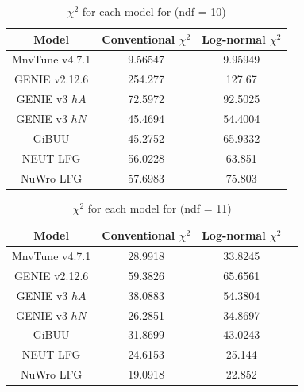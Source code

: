 \documentclass[aps,prl,twocolumn,showpacs,superscriptaddress,letterpaper,showkeys,superscriptaddress,floatfix,nofootinbib]{revtex4-1}
\begin{document}
\begin{table}[H]
  \centering
  \renewcommand{\arraystretch}{1.15}
  \caption{$\chi^2$ for each model for \Tpi (ndf = 10)}
    \begin{tabular}{c||c|c}
        Model & Conventional $\chi^2$ & Log-normal $\chi^2$ \\
        \hline
        \hline
        MnvTune v4.7.1 & 9.56547 & 9.95949\\
        GENIE v2.12.6 & 254.277 & 127.67\\
        GENIE v3 $hA$  & 72.5972 & 92.5025\\
        GENIE v3 $hN$  & 45.4694 & 54.4004\\
        GiBUU & 45.2752 & 65.9332\\
        NEUT LFG & 56.0228 & 63.851\\
        NuWro LFG & 57.6983 & 75.803\\

    \end{tabular}
  \label{tbl:chi2_tpi}
\end{table}

\begin{table}[H]
  \centering
  \renewcommand{\arraystretch}{1.15}
  \caption{ $\chi^2$ for each model for \thpi (ndf = 11)}
    \begin{tabular}{c||c|c|c}

      Model & Conventional $\chi^2$ & Log-normal $\chi^2$ \\
      \hline
      \hline
        MnvTune v4.7.1 & 28.9918 & 33.8245\\
        GENIE v2.12.6 & 59.3826 & 65.6561\\
        GENIE v3 $hA$  & 38.0883 & 54.3804\\
        GENIE v3 $hN$  & 26.2851 & 34.8697\\
        GiBUU & 31.8699 & 43.0243\\
        NEUT LFG & 24.6153 & 25.144\\
        NuWro LFG & 19.0918 & 22.852\\
        
    \end{tabular}
  \label{tbl:chi2_thpi}
\end{table}
\end{document}
